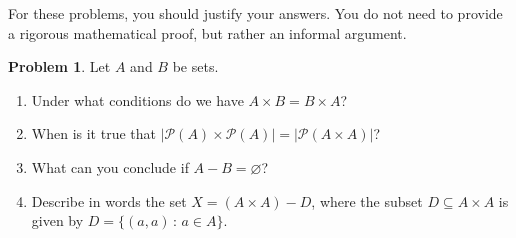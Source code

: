 \documentclass[12pt]{amsart}
\newcounter{problem_number}[section]
\theoremstyle{named}
\theoremstyle{definition}
\newtheorem{problem}{Problem}
\begin{document}
For these problems, you should justify your answers. You do not need to provide a rigorous mathematical proof, but rather an informal argument.

\begin{problem}
	Let $A$ and $B$ be sets.
	\begin{enumerate}
		\item Under what conditions do we have $A\times B = B\times A$?
		\item When is it true that $|\mathscr P(A)\times\mathscr P(A)| = |\mathscr P(A\times A)|$?
		\item What can you conclude if $A-B = \varnothing$?
		\item Describe in words the set $X=(A\times A)-D$, where the subset $D\subseteq A\times A$ is given by $D = \{(a,a)\,:\, a\in A\}$.
	\end{enumerate}
\end{problem}
\end{document}
